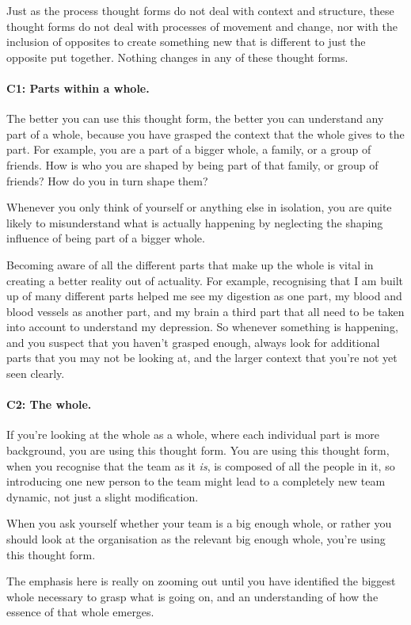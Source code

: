 Just as the process thought forms do not deal with context and structure, these thought forms do not deal with processes of movement and change, nor with the inclusion of opposites to create something new that is different to just the opposite put together. Nothing changes in any of these thought forms.
\paragraph{\textbf{C1: Parts within a whole.}}
The better you can use this thought form, the better you can understand any part of a whole, because you have grasped the context that the whole gives to the part. For example, you are a part of a bigger whole, a family, or a group of friends. How is who you are shaped by being part of that family, or group of friends? How do you in turn shape them?


Whenever you only think of yourself or anything else in isolation, you are quite likely to misunderstand what is actually happening by neglecting the shaping influence of being part of a bigger whole.


Becoming aware of all the different parts that make up the whole is vital in creating a better reality out of actuality. For example, recognising that I am built up of many different parts helped me see my digestion as one part, my blood and blood vessels as another part, and my brain a third part that all need to be taken into account to understand my depression. So whenever something is happening, and you suspect that you haven't grasped enough, always look for additional parts that you may not be looking at, and the larger context that you're not yet seen clearly.
\paragraph{\textbf{C2: The whole.}}
If you're looking at the whole as a whole, where each individual part is more background, you are using this thought form. You are using this thought form, when you recognise that the team as it \emph{is}, is composed of all the people in it, so introducing one new person to the team might lead to a completely new team dynamic, not just a slight modification.


When you ask yourself whether your team is a big enough whole, or rather you should look at the organisation as the relevant big enough whole, you're using this thought form. 


The emphasis here is really on zooming out until you have identified the biggest whole necessary to grasp what is going on, and an understanding of how the essence of that whole emerges.


